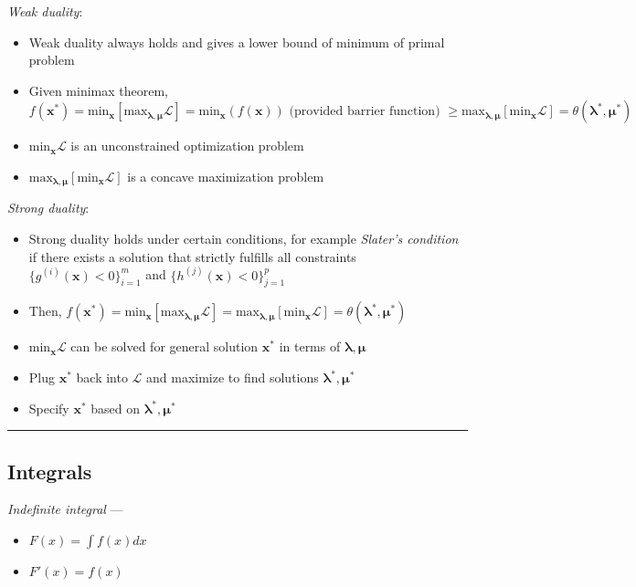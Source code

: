 \emph{Weak duality}:
\begin{itemize}
    \item Weak duality always holds and gives a lower bound of minimum of primal problem
    \item Given minimax theorem, $f(\boldsymbol{x}^*) = \textrm{min}_{\boldsymbol{x}} [\textrm{max}_{\boldsymbol{\lambda},\boldsymbol{\mu}} \mathcal{L}] = \textrm{min}_{\boldsymbol{x}}(f(\boldsymbol{x})) \textrm{ (provided barrier function) } \geq \textrm{max}_{\boldsymbol{\lambda},\boldsymbol{\mu}} [\textrm{min}_{\boldsymbol{x}} \mathcal{L}] = \theta(\boldsymbol{\lambda}^*,\boldsymbol{\mu}^*)$
    \item $\textrm{min}_{\boldsymbol{x}} \mathcal{L}$ is an unconstrained optimization problem 
    \item $\textrm{max}_{\boldsymbol{\lambda},\boldsymbol{\mu}} [\textrm{min}_{\boldsymbol{x}} \mathcal{L}]$ is a concave maximization problem 
\end{itemize}
\emph{Strong duality}:
\begin{itemize}
    \item Strong duality holds under certain conditions, for example \emph{Slater's condition} if there exists a solution that strictly fulfills all constraints $\{g^{(i)}(\boldsymbol{x}) < 0\}_{i=1}^m$ and $\{h^{(j)}(\boldsymbol{x}) < 0\}_{j=1}^p$
    \item Then, $f(\boldsymbol{x}^*) = \textrm{min}_{\boldsymbol{x}} [\textrm{max}_{\boldsymbol{\lambda},\boldsymbol{\mu}} \mathcal{L}] = \textrm{max}_{\boldsymbol{\lambda},\boldsymbol{\mu}} [\textrm{min}_{\boldsymbol{x}} \mathcal{L}]= \theta(\boldsymbol{\lambda}^*,\boldsymbol{\mu}^*)$
    \item $\textrm{min}_{\boldsymbol{x}} \mathcal{L}$ can be solved for general solution $\boldsymbol{x^*}$ in terms of $\boldsymbol{\lambda},\boldsymbol{\mu}$
    \item Plug $\boldsymbol{x^*}$ back into $\mathcal{L}$ and maximize to find solutions $\boldsymbol{\lambda^*},\boldsymbol{\mu^*}$
    \item Specify $\boldsymbol{x^*}$ based on $\boldsymbol{\lambda^*},\boldsymbol{\mu^*}$
\end{itemize}

{\color{black}\hrule height 0.001mm}

\subsection*{Integrals}
\emph{Indefinite integral} --- 
\begin{itemize}
    \item $F(x) = \int f(x) dx$
    \item $F'(x) = f(x)$
\end{itemize}

